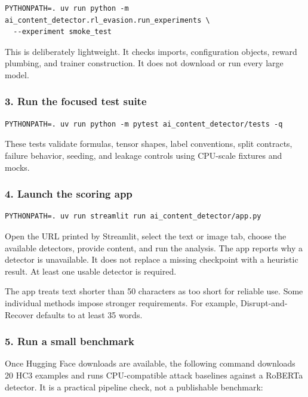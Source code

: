 \begin{Verbatim}
PYTHONPATH=. uv run python -m ai_content_detector.rl_evasion.run_experiments \
  --experiment smoke_test
\end{Verbatim}

This is deliberately lightweight. It checks imports, configuration
objects, reward plumbing, and trainer construction. It does not download
or run every large model.

\subsubsection{3. Run the focused test
suite}\label{record-docs-research-guide-md-run-the-focused-test-suite}

\begin{Verbatim}
PYTHONPATH=. uv run python -m pytest ai_content_detector/tests -q
\end{Verbatim}

These tests validate formulas, tensor shapes, label conventions, split
contracts, failure behavior, seeding, and leakage controls using
CPU-scale fixtures and mocks.

\subsubsection{4. Launch the scoring
app}\label{record-docs-research-guide-md-launch-the-scoring-app}

\begin{Verbatim}
PYTHONPATH=. uv run streamlit run ai_content_detector/app.py
\end{Verbatim}

Open the URL printed by Streamlit, select the text or image tab, choose
the available detectors, provide content, and run the analysis. The app
reports why a detector is unavailable. It does not replace a missing
checkpoint with a heuristic result. At least one usable detector is
required.

The app treats text shorter than 50 characters as too short for reliable
use. Some individual methods impose stronger requirements. For example,
Disrupt-and-Recover defaults to at least 35 words.

\subsubsection{5. Run a small
benchmark}\label{record-docs-research-guide-md-run-a-small-benchmark}

Once Hugging Face downloads are available, the following command
downloads 20 HC3 examples and runs CPU-compatible attack baselines
against a RoBERTa detector. It is a practical pipeline check, not a
publishable benchmark:

